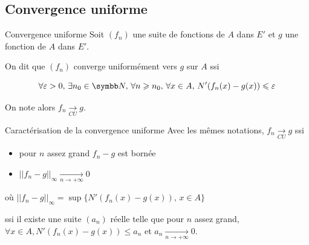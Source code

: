 \subsection{Convergence uniforme}

\begin{definition}{Convergence uniforme}{}
    Soit $(f_n)$ une suite de fonctions de $A$ dans $E'$ et $g$ une fonction de $A$ dans $E'$.

    On dit que $(f_n)$ converge uniformément vers $g$ sur $A$ ssi 
    
    $$\forall \varepsilon >0, \, \exists n_0 \in \N, \, \forall n \geqslant n_0, \, \forall x \in A, \, N'(f_n(x) - g(x) ) \leqslant \varepsilon$$

    On note alors $f_n \xrightarrow[CU]{} g$.
\end{definition}

\begin{proposition}{Caractérisation de la convergence uniforme}{}
    Avec les mêmes notations, $f_n \xrightarrow[CU]{} g$ ssi 
    
    \begin{itemize}
        \item pour $n$ assez grand $f_n - g$ est bornée 
        \item $\displaystyle || f_n - g ||_{\infty} \xrightarrow[n\to +\infty]{} 0$
    \end{itemize}

    où $\displaystyle || f_n - g ||_{\infty} = \sup\{ N'(f_n(x) - g(x)), \, x \in A \}$
    
    ssi il existe une suite $(a_n)$ réelle telle que pour $n$ assez grand, 
    $\forall x \in A, N'(f_n(x) - g(x)) \leqslant a_n$ et $a_n \xrightarrow[n\to +\infty]{} 0$.
     
\end{proposition}


